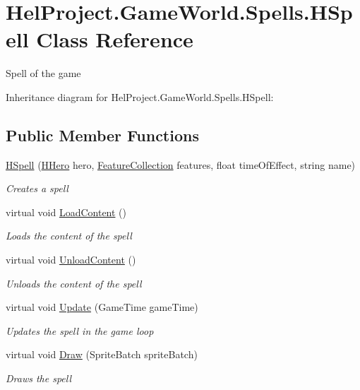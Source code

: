 \hypertarget{class_hel_project_1_1_game_world_1_1_spells_1_1_h_spell}{}\section{Hel\+Project.\+Game\+World.\+Spells.\+H\+Spell Class Reference}
\label{class_hel_project_1_1_game_world_1_1_spells_1_1_h_spell}


Spell of the game  




Inheritance diagram for Hel\+Project.\+Game\+World.\+Spells.\+H\+Spell\+:
\subsection*{Public Member Functions}
\begin{DoxyCompactItemize}
\item 
\hyperlink{class_hel_project_1_1_game_world_1_1_spells_1_1_h_spell_a0320952c7e7ed4bda12288dc6f9e0f62}{H\+Spell} (\hyperlink{class_hel_project_1_1_game_world_1_1_entities_1_1_h_hero}{H\+Hero} hero, \hyperlink{class_hel_project_1_1_features_1_1_feature_collection}{Feature\+Collection} features, float time\+Of\+Effect, string name)
\begin{DoxyCompactList}\small\item\em Creates a spell \end{DoxyCompactList}\item 
virtual void \hyperlink{class_hel_project_1_1_game_world_1_1_spells_1_1_h_spell_a2c30200e62a6a938156035098a9c6a1f}{Load\+Content} ()
\begin{DoxyCompactList}\small\item\em Loads the content of the spell \end{DoxyCompactList}\item 
virtual void \hyperlink{class_hel_project_1_1_game_world_1_1_spells_1_1_h_spell_a760e3d340c43f234465d07e2782e3e3a}{Unload\+Content} ()
\begin{DoxyCompactList}\small\item\em Unloads the content of the spell \end{DoxyCompactList}\item 
virtual void \hyperlink{class_hel_project_1_1_game_world_1_1_spells_1_1_h_spell_a19c9c7c407b20861184ef8538614142b}{Update} (Game\+Time game\+Time)
\begin{DoxyCompactList}\small\item\em Updates the spell in the game loop \end{DoxyCompactList}\item 
virtual void \hyperlink{class_hel_project_1_1_game_world_1_1_spells_1_1_h_spell_a71cfca2b0bd3d7bcc91d8fae7180a21f}{Draw} (Sprite\+Batch sprite\+Batch)
\begin{DoxyCompactList}\small\item\em Draws the spell \end{DoxyCompactList}\end{DoxyCompactItemize}
